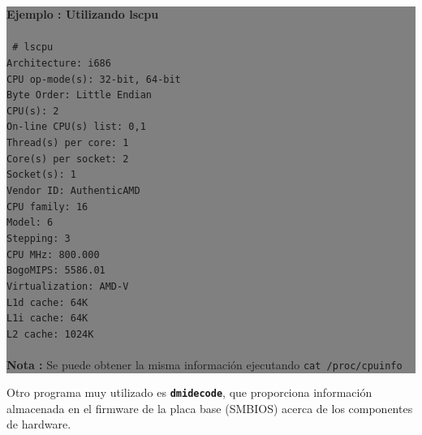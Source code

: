 \documentclass[12pt]{article}
\begin{document}
\colorbox{grey}{\parbox[t]{0.95\linewidth}{ \vspace*{0.5cm} { 
{\bf Ejemplo : Utilizando lscpu }
\\ \\
{\tt \small
\# lscpu \\
Architecture:          i686\\
CPU op-mode(s):        32-bit, 64-bit\\
Byte Order:            Little Endian\\
CPU(s):                2\\
On-line CPU(s) list:   0,1\\
Thread(s) per core:    1\\
Core(s) per socket:    2\\
Socket(s):             1\\
Vendor ID:             AuthenticAMD\\
CPU family:            16\\
Model:                 6\\
Stepping:              3\\
CPU MHz:               800.000\\
BogoMIPS:              5586.01\\
Virtualization:        AMD-V\\
L1d cache:             64K\\
L1i cache:             64K\\
L2 cache:              1024K\\
}
\\
{\bf Nota :} Se puede obtener la misma información ejecutando \texttt{cat /proc/cpuinfo}
} \vspace*{0.5cm} } } 

Otro programa muy utilizado es \textbf{\texttt{dmidecode}}, que proporciona
información almacenada en el firmware de la placa base (SMBIOS) acerca de los componentes de 
hardware. 
\end{document}
